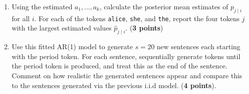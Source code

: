 \documentclass{scrartcl}
\begin{document}
\begin{enumerate}
\begin{enumerate}
 \item Using the estimated $a_1, \dots, a_k$, calculate the posterior
   mean estimates of $p_{j \mid i}$ for all $i$. For each of the
   tokens \texttt{alice}, \texttt{she}, and \texttt{the}, report the
   four tokens $j$ with the largest estimated values $\hat{p}_{j \mid
     i}$. (\textbf{3 points})
\item Use this fitted AR(1) model to generate $s = 20$ new sentences
  each starting with the period token. For each sentence, sequentially
  generate tokens until the period token is produced, and treat this
  as the end of the sentence. Comment on how realistic the generated
  sentences appear and compare this to the sentences generated via the
  previous i.i.d model. (\textbf{4 points}). 
 \end{enumerate}
  

  




\end{enumerate}
\end{document}
